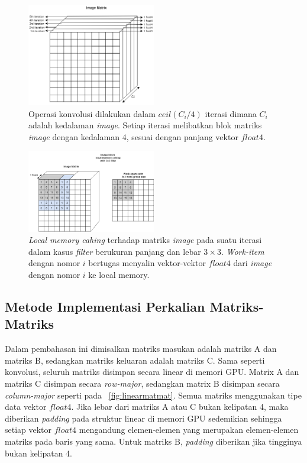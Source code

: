 \begin{figure}
	\centering
	\includegraphics[width=0.50\textwidth]
	{pics/conviter.png}
	\caption{Operasi konvolusi dilakukan dalam $ceil(C_i/4)$ iterasi dimana $C_i$ adalah kedalaman \textit{image}. Setiap iterasi melibatkan blok matriks \textit{image} dengan kedalaman 4, sesuai dengan panjang vektor $float4$.}
	\label{fig:conviter}
\end{figure}

\begin{figure}
	\centering
	\includegraphics[width=0.50\textwidth]
	{pics/convlocal.png}
	\caption{\textit{Local memory cahing} terhadap matriks \textit{image} pada suatu iterasi dalam kasus \textit{filter} berukuran panjang dan lebar $3 \times 3$. \textit{Work-item} dengan nomor $i$ bertugas menyalin vektor-vektor $float4$ dari \textit{image} dengan nomor $i$ ke local memory.}
	\label{fig:convlocal}
\end{figure}

\subsection{Metode Implementasi Perkalian Matriks-Matriks }
Dalam pembahasan ini dimisalkan matriks masukan adalah matriks A dan matriks B, sedangkan matriks keluaran adalah matriks C. Sama seperti konvolusi, seluruh matriks disimpan secara linear di memori GPU. Matrix A dan matriks C disimpan secara \textit{row-major}, sedangkan matrix B disimpan secara \textit{column-major} seperti pada \pic~\ref{fig:linearmatmat}.  Semua matriks menggunakan tipe data vektor $float4$. Jika lebar dari matriks A atau C bukan kelipatan 4, maka diberikan \textit{padding} pada struktur linear di memori GPU sedemikian sehingga setiap vektor $float4$ mengandung elemen-elemen yang merupakan elemen-elemen matriks pada baris yang sama. Untuk matriks B, \textit{padding} diberikan jika tingginya bukan kelipatan 4.

